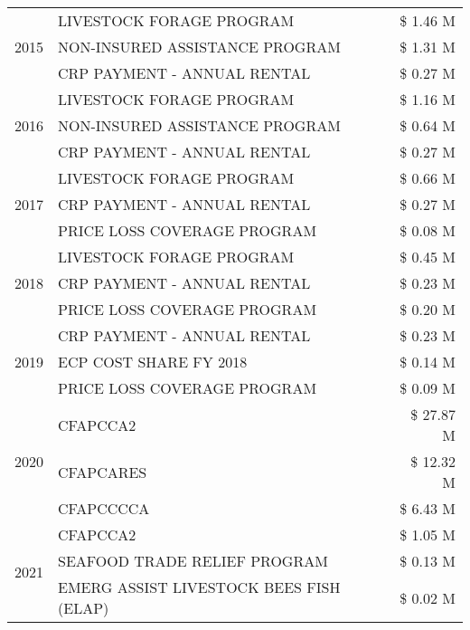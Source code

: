 \begin{tabular}{llr}
\multirow[t]{3}{*}{2015} & LIVESTOCK FORAGE PROGRAM & \$ 1.46 M \\
 & NON-INSURED ASSISTANCE PROGRAM & \$ 1.31 M \\
 & CRP PAYMENT - ANNUAL RENTAL & \$ 0.27 M \\
\cline{1-3}
\multirow[t]{3}{*}{2016} & LIVESTOCK FORAGE PROGRAM                      & \$ 1.16 M \\
 & NON-INSURED ASSISTANCE PROGRAM                & \$ 0.64 M \\
 & CRP PAYMENT - ANNUAL RENTAL                   & \$ 0.27 M \\
\cline{1-3}
\multirow[t]{3}{*}{2017} & LIVESTOCK FORAGE PROGRAM & \$ 0.66 M \\
 & CRP PAYMENT - ANNUAL RENTAL & \$ 0.27 M \\
 & PRICE LOSS COVERAGE PROGRAM & \$ 0.08 M \\
\cline{1-3}
\multirow[t]{3}{*}{2018} & LIVESTOCK FORAGE PROGRAM & \$ 0.45 M \\
 & CRP PAYMENT - ANNUAL RENTAL & \$ 0.23 M \\
 & PRICE LOSS COVERAGE PROGRAM & \$ 0.20 M \\
\cline{1-3}
\multirow[t]{3}{*}{2019} & CRP PAYMENT - ANNUAL RENTAL & \$ 0.23 M \\
 & ECP COST SHARE FY 2018 & \$ 0.14 M \\
 & PRICE LOSS COVERAGE PROGRAM & \$ 0.09 M \\
\cline{1-3}
\multirow[t]{3}{*}{2020} & CFAPCCA2 & \$ 27.87 M \\
 & CFAPCARES & \$ 12.32 M \\
 & CFAPCCCCA & \$ 6.43 M \\
\cline{1-3}
\multirow[t]{3}{*}{2021} & CFAPCCA2 & \$ 1.05 M \\
 & SEAFOOD TRADE RELIEF PROGRAM & \$ 0.13 M \\
 & EMERG ASSIST LIVESTOCK BEES FISH (ELAP) & \$ 0.02 M \\
\cline{1-3}
\bottomrule
\end{tabular}

